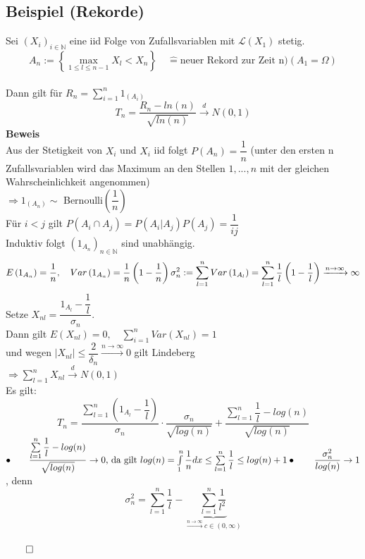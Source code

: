 \documentclass[german,10pt,oneside, fleqn, a4paper]{article}
\newcommand {\N}	{\mathbb{N}}
\newcommand{\Ra}	{\Rightarrow}
\newcommand{\ra}{\rightarrow}
\newcommand{\sm}[2][\infty]{\sum\limits_{#2}^{#1}}
\newcommand{\brc}[1]{\left(#1\right)}
\newcommand{\brac}[1]{\left\lbrace #1\right\rbrace}
\newcommand{\folge}[3][\N]{\left(#2_#3\right)_{#3\in #1}}
\newcommand{\QED}{\begin{flushright}$\qed$\end{flushright}}
\newcommand{\mc}[1]{\mathcal{#1}}
\newcommand{\beweis}{\textbf{Beweis}\\}
\newcommand{\toinf}{\rightarrow\infty}
\newcommand{\1}[1]{1_{#1}}
\newcommand{\2}[1]{\1{\brac{#1}}}
\newcommand{\xr}[2][]{\xrightarrow[#1]{#2}}
\begin{document}
\subsection{Beispiel (Rekorde)}
\label{5.9}
Sei $\folge{X}{i}$ eine iid Folge von Zufallsvariablen mit $\mc{L}(X_1)$ stetig.\\
\[A_n:=\brac{\max\limits_{1\leq l\leq n-1}X_l<X_n}\quad \widehat{=}\text{neuer Rekord zur Zeit n})(A_1=\Omega)\]\\
Dann gilt für $R_n=\sm[n]{i=1}1_(A_i)$\[
T_n=\dfrac{R_n-ln(n)}{\sqrt{ln(n)}}\xr{d}N(0,1)
\]
\beweis
Aus der Stetigkeit von $X_i$ und $X_i$ iid folgt $P(A_n)=\dfrac{1}{n}$ (unter den ersten n Zufallsvariablen wird das Maximum an den Stellen $1,...,n$ mit der gleichen Wahrscheinlichkeit angenommen)\\
$\Ra 1_(A_n)\sim$ Bernoulli$\brc{\dfrac{1}{n}}$\\
Für $i<j$ gilt $P(A_i\cap A_j)=P(A_i|A_j)P(A_j)=\dfrac{1}{ij}$\\
Induktiv folgt $\brc{1_{A_n}}_{n\in\N}$ sind unabhängig.\[
E\brc{1_{A_n}}=\dfrac{1}{n},\quad Var\brc{1_{A_n}}=\dfrac{1}{n}\brc{1-\dfrac{1}{n}}\\
\sigma_n^2:=\sm[n]{l=1}Var\brc{1_{A_l}}=\sm[n]{l=1}\dfrac{1}{l}\brc{1-\dfrac{1}{l}}\xr{n\toinf}\infty
\]
Setze $X_{nl}=\dfrac{1_{A_l}-\dfrac{1}{l}}{\sigma_n}$.\\
Dann gilt $E(X_{nl})=0,\quad \sm[n]{i=1}Var\brc{X_{nl}}=1$ \\
und wegen $|X_{nl}|\leq\dfrac{2}{\delta_n}\xr{n\toinf}0$ gilt Lindeberg\\
$\Ra\sm[n]{l=1}X_{nl}\xr{d}N(0,1)$\\
Es gilt:\[
T_n=\dfrac{\sm[n]{l=1}\brc{1_{A_l}-\dfrac{1}{l}}}{\sigma_n}\cdot\dfrac{\sigma_n}{\sqrt{log(n)}}+\dfrac{\sm[n]{l=1}\dfrac{1}{l}-log(n)}{\sqrt{log(n)}}\]
$\bullet\qquad\dfrac{\sm[n]{l=1}\dfrac{1}{l}-log(n)}{\sqrt{log(n)}}\ra 0\text{, da gilt }log(n)=\int\limits_1^n\dfrac{1}{n}dx\leq\sm[n]{l=1}\dfrac{1}{l}\leq log(n)+1\\
\bullet\qquad\dfrac{\sigma_n^2}{log(n)}\ra 1$, denn\[
\sigma_n^2=\sm[n]{l=1}\dfrac{1}{l}-\underbrace{\sm[n]{l=1}\dfrac{1}{l^2}}_{\xr{n\toinf}c\in(0,\infty)}
\]\QED
\end{document}

